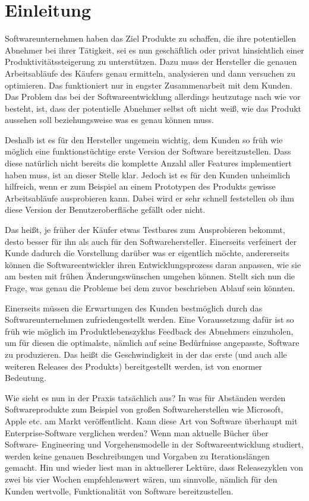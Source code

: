 \section{Einleitung}
\label{sec:einleitung}

Softwareunternehmen haben das Ziel Produkte zu schaffen, die ihre potentiellen
Abnehmer bei ihrer Tätigkeit, sei es nun geschäftlich oder privat hinsichtlich
einer Produktivitätssteigerung zu unterstützen. Dazu muss der Hersteller die
genauen Arbeitsabläufe des Käufers genau ermitteln, analysieren und dann
versuchen zu optimieren. Das funktioniert nur in engster Zusammenarbeit mit
dem Kunden. Das Problem das bei der Softwareentwicklung allerdings heutzutage
nach wie vor besteht, ist, dass der potentielle Abnehmer selbst oft nicht
weiß, wie das Produkt aussehen soll beziehungsweise was es genau können muss.

Deshalb ist es für den Hersteller ungemein wichtig, dem Kunden so früh wie
möglich eine funktionstüchtige erste Version der Software bereitzustellen.
Dass diese natürlich nicht bereits die komplette Anzahl aller Features
implementiert haben muss, ist an dieser Stelle klar. Jedoch ist es für den
Kunden unheimlich hilfreich, wenn er zum Beispiel an einem Prototypen des
Produkts gewisse Arbeitsabläufe ausprobieren kann. Dabei wird er sehr schnell
feststellen ob ihm diese Version der Benutzeroberfläche gefällt oder nicht.

Das heißt, je früher der Käufer etwas Testbares zum Ausprobieren bekommt,
desto besser für ihn als auch für den Softwarehersteller. Einerseits
verfeinert der Kunde dadurch die Vorstellung darüber was er eigentlich möchte,
andererseits können die Softwareentwickler ihren Entwicklungsprozess daran
anpassen, wie sie am besten mit frühen Änderungswünschen umgehen können.
Stellt sich nun die Frage, was genau die Probleme bei dem zuvor beschrieben
Ablauf sein könnten.

Einerseits müssen die Erwartungen des Kunden bestmöglich durch das
Softwareunternehmen zufriedengestellt werden. Eine Voraussetzung dafür ist so
früh wie möglich im Produktlebenszyklus Feedback des Abnehmers einzuholen, um
für diesen die optimalste, nämlich auf seine Bedürfnisse angepasste, Software
zu produzieren. Das heißt die Geschwindigkeit in der das erste (und auch alle
weiteren Releases des Produkts) bereitgestellt werden, ist von enormer
Bedeutung.

Wie sieht es nun in der Praxis tatsächlich aus? In was für Abständen werden
Softwareprodukte zum Beispiel von großen Softwareherstellen wie Microsoft,
Apple etc. am Markt veröffentlicht. Kann diese Art von Software überhaupt mit
Enterprise-Software verglichen werden? Wenn man aktuelle Bücher über Software-
Engineering und Vorgehensmodelle in der Softwareentwicklung studiert, werden
keine genauen Beschreibungen und Vorgaben zu Iterationslängen gemacht. Hin und
wieder liest man in aktuellerer Lektüre, dass Releasezyklen von zwei bis vier
Wochen empfehlenswert wären, um sinnvolle, nämlich für den Kunden wertvolle,
Funktionalität von Software bereitzustellen.

